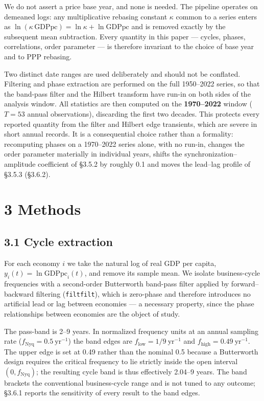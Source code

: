 \documentclass[11pt,a4paper]{article}
\newcounter{none}                    %
\begin{document}
We do not assert a price base year, and none is needed. The pipeline operates on demeaned logs: any multiplicative rebasing constant \(\kappa\) common to a series enters as \(\ln(\kappa\,\mathrm{GDPpc}) = \ln\kappa + \ln \mathrm{GDPpc}\) and is removed exactly by the subsequent mean subtraction. Every quantity in this paper — cycles, phases, correlations, order parameter — is therefore invariant to the choice of base year and to PPP rebasing.

Two distinct date ranges are used deliberately and should not be conflated. Filtering and phase extraction are performed on the full 1950–2022 series, so that the band-pass filter and the Hilbert transform have run-in on both sides of the analysis window. All statistics are then computed on the \textbf{1970–2022} window (\(T = 53\) annual observations), discarding the first two decades. This protects every reported quantity from the filter and Hilbert edge transients, which are severe in short annual records. It is a consequential choice rather than a formality: recomputing phases on a 1970–2022 series alone, with no run-in, changes the order parameter materially in individual years, shifts the synchronization–amplitude coefficient of §3.5.2 by roughly 0.1 and moves the lead–lag profile of §3.5.3 (§3.6.2).

\section{3 Methods}\label{methods}

\subsection{3.1 Cycle extraction}\label{cycle-extraction}

For each economy \(i\) we take the natural log of real GDP per capita, \(y_i(t) = \ln \mathrm{GDPpc}_i(t)\), and remove its sample mean. We isolate business-cycle frequencies with a second-order Butterworth band-pass filter applied by forward–backward filtering (\texttt{filtfilt}), which is zero-phase and therefore introduces no artificial lead or lag between economies — a necessary property, since the phase relationships between economies are the object of study.

The pass-band is 2–9 years. In normalized frequency units at an annual sampling rate (\(f_{\mathrm{Nyq}} = 0.5\ \mathrm{yr}^{-1}\)) the band edges are \(f_{\mathrm{low}} = 1/9\ \mathrm{yr}^{-1}\) and \(f_{\mathrm{high}} = 0.49\ \mathrm{yr}^{-1}\). The upper edge is set at 0.49 rather than the nominal 0.5 because a Butterworth design requires the critical frequency to lie strictly inside the open interval \((0, f_{\mathrm{Nyq}})\); the resulting cycle band is thus effectively 2.04–9 years. The band brackets the conventional business-cycle range and is not tuned to any outcome; §3.6.1 reports the sensitivity of every result to the band edges.
\end{document}
